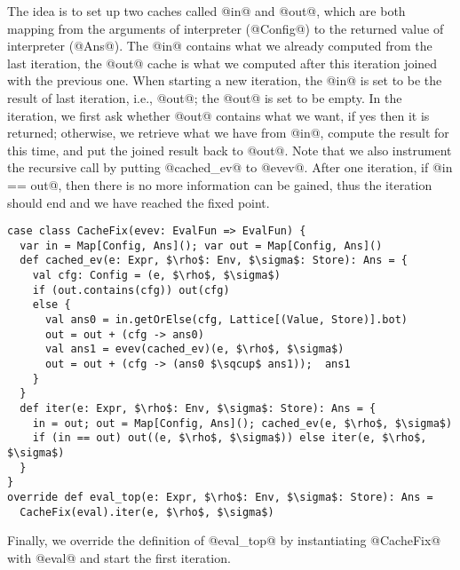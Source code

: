 The idea is to set up two caches called @in@ and @out@, which are both mapping from the arguments of interpreter 
(@Config@) to the returned value of interpreter (@Ans@). The @in@ contains what we already computed from the last
iteration, the @out@ cache is what we computed after this iteration joined with the previous one.
When starting a new iteration, the @in@ is set to be the result of last iteration, i.e., @out@; the @out@ is set
to be empty. In the iteration, we first ask whether @out@ contains what we want, if yes then it is returned;
otherwise, we retrieve what we have from @in@, compute the result for this time, and put the joined result back to @out@.
Note that we also instrument the recursive call by putting @cached_ev@ to @evev@.
After one iteration, if @in == out@, then there is no more information can be gained, thus the iteration should 
end and we have reached the fixed point.

\begin{lstlisting}
case class CacheFix(evev: EvalFun => EvalFun) {
  var in = Map[Config, Ans](); var out = Map[Config, Ans]()
  def cached_ev(e: Expr, $\rho$: Env, $\sigma$: Store): Ans = {
    val cfg: Config = (e, $\rho$, $\sigma$)
    if (out.contains(cfg)) out(cfg)
    else {
      val ans0 = in.getOrElse(cfg, Lattice[(Value, Store)].bot)
      out = out + (cfg -> ans0)
      val ans1 = evev(cached_ev)(e, $\rho$, $\sigma$)
      out = out + (cfg -> (ans0 $\sqcup$ ans1));  ans1
    }
  }
  def iter(e: Expr, $\rho$: Env, $\sigma$: Store): Ans = {
    in = out; out = Map[Config, Ans](); cached_ev(e, $\rho$, $\sigma$)
    if (in == out) out((e, $\rho$, $\sigma$)) else iter(e, $\rho$, $\sigma$)
  }
}
override def eval_top(e: Expr, $\rho$: Env, $\sigma$: Store): Ans = 
  CacheFix(eval).iter(e, $\rho$, $\sigma$)
\end{lstlisting}

Finally, we override the definition of @eval_top@ by instantiating @CacheFix@ with @eval@ and start 
the first iteration.
